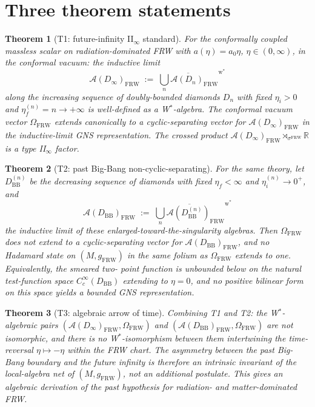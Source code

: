 \documentclass[11pt]{article}
\newtheorem{theorem}{Theorem}
\theoremstyle{definition}
\newcommand{\R}{\mathbb{R}}
\renewcommand{\AA}{\mathcal{A}}
\newcommand{\BB}{\mathrm{BB}}
\newcommand{\FRW}{\mathrm{FRW}}
\begin{document}
\section{Three theorem statements}

\begin{theorem}[T1: future-infinity II$_\infty$ standard]\label{thm:future}
For the conformally coupled massless scalar on radiation-dominated FRW
with $a(\eta)=a_0\eta$, $\eta\in(0,\infty)$, in the conformal vacuum:
the inductive limit
\begin{equation*}
\AA(D_\infty)_\FRW \;:=\; \overline{\bigcup_{n} \AA(D_n)_\FRW}^{\mathrm{w}^*}
\end{equation*}
along the increasing sequence of doubly-bounded diamonds $D_n$ with fixed
$\eta_i>0$ and $\eta_f^{(n)}=n\to+\infty$ is well-defined as a
W$^*$-algebra. The conformal vacuum vector $\Omega_\FRW$ extends
canonically to a cyclic-separating vector for $\AA(D_\infty)_\FRW$ in the
inductive-limit GNS representation. The crossed product
$\AA(D_\infty)_\FRW \rtimes_{\sigma^\FRW}\R$ is a type II$_\infty$ factor.
\end{theorem}

\begin{theorem}[T2: past Big-Bang non-cyclic-separating]\label{thm:past}
For the same theory, let $D_\BB^{(n)}$ be the decreasing sequence of
diamonds with fixed $\eta_f<\infty$ and $\eta_i^{(n)}\to 0^+$, and
\begin{equation*}
\AA(D_\BB)_\FRW \;:=\; \overline{\bigcup_n \AA(D_\BB^{(n)})_\FRW}^{\mathrm{w}^*}
\end{equation*}
the inductive limit of these enlarged-toward-the-singularity algebras.
Then $\Omega_\FRW$ does not extend to a cyclic-separating vector for
$\AA(D_\BB)_\FRW$, and no Hadamard state on $(M,g_\FRW)$ in the same
folium as $\Omega_\FRW$ extends to one. Equivalently, the smeared two-
point function is unbounded below on the natural test-function space
$C_c^\infty(D_\BB)$ extending to $\eta=0$, and no positive bilinear
form on this space yields a bounded GNS representation.
\end{theorem}

\begin{theorem}[T3: algebraic arrow of time]\label{thm:arrow}
Combining T1 and T2: the W$^*$-algebraic pairs
$(\AA(D_\infty)_\FRW,\Omega_\FRW)$ and $(\AA(D_\BB)_\FRW,\Omega_\FRW)$
are not isomorphic, and there is no W$^*$-isomorphism between them
intertwining the time-reversal $\eta\mapsto-\eta$ within the FRW chart.
The asymmetry between the past Big-Bang boundary and the future infinity
is therefore an intrinsic invariant of the local-algebra net of
$(M,g_\FRW)$, not an additional postulate. This gives an algebraic
derivation of the past hypothesis for radiation- and matter-dominated FRW.
\end{theorem}
\end{document}
